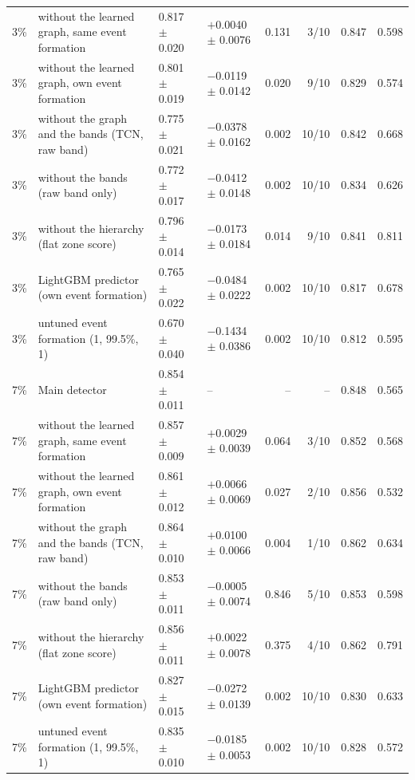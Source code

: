 \documentclass[11pt,a4paper]{article}
\begin{document}
\begin{longtable}{@{}l >{\raggedright\arraybackslash}p{4.4cm} l l r r r r@{}}
3\% & without the learned graph, same event formation & 0.817 $\pm$ 0.020 & $+$0.0040 $\pm$ 0.0076 & 0.131 & 3/10 & 0.847 & 0.598 \\
3\% & without the learned graph, own event formation & 0.801 $\pm$ 0.019 & $-$0.0119 $\pm$ 0.0142 & 0.020 & 9/10 & 0.829 & 0.574 \\
3\% & without the graph and the bands (TCN, raw band) & 0.775 $\pm$ 0.021 & $-$0.0378 $\pm$ 0.0162 & 0.002 & 10/10 & 0.842 & 0.668 \\
3\% & without the bands (raw band only) & 0.772 $\pm$ 0.017 & $-$0.0412 $\pm$ 0.0148 & 0.002 & 10/10 & 0.834 & 0.626 \\
3\% & without the hierarchy (flat zone score) & 0.796 $\pm$ 0.014 & $-$0.0173 $\pm$ 0.0184 & 0.014 & 9/10 & 0.841 & 0.811 \\
3\% & LightGBM predictor (own event formation) & 0.765 $\pm$ 0.022 & $-$0.0484 $\pm$ 0.0222 & 0.002 & 10/10 & 0.817 & 0.678 \\
3\% & untuned event formation (1, 99.5\%, 1) & 0.670 $\pm$ 0.040 & $-$0.1434 $\pm$ 0.0386 & 0.002 & 10/10 & 0.812 & 0.595 \\
\midrule
7\% & Main detector & 0.854 $\pm$ 0.011 & -- & -- & -- & 0.848 & 0.565 \\
7\% & without the learned graph, same event formation & 0.857 $\pm$ 0.009 & $+$0.0029 $\pm$ 0.0039 & 0.064 & 3/10 & 0.852 & 0.568 \\
7\% & without the learned graph, own event formation & 0.861 $\pm$ 0.012 & $+$0.0066 $\pm$ 0.0069 & 0.027 & 2/10 & 0.856 & 0.532 \\
7\% & without the graph and the bands (TCN, raw band) & 0.864 $\pm$ 0.010 & $+$0.0100 $\pm$ 0.0066 & 0.004 & 1/10 & 0.862 & 0.634 \\
7\% & without the bands (raw band only) & 0.853 $\pm$ 0.011 & $-$0.0005 $\pm$ 0.0074 & 0.846 & 5/10 & 0.853 & 0.598 \\
7\% & without the hierarchy (flat zone score) & 0.856 $\pm$ 0.011 & $+$0.0022 $\pm$ 0.0078 & 0.375 & 4/10 & 0.862 & 0.791 \\
7\% & LightGBM predictor (own event formation) & 0.827 $\pm$ 0.015 & $-$0.0272 $\pm$ 0.0139 & 0.002 & 10/10 & 0.830 & 0.633 \\
7\% & untuned event formation (1, 99.5\%, 1) & 0.835 $\pm$ 0.010 & $-$0.0185 $\pm$ 0.0053 & 0.002 & 10/10 & 0.828 & 0.572 \\
\end{longtable}
\endgroup
\end{document}
